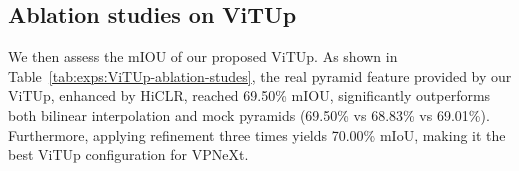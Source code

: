 \begin{table}[ht]
    \centering
    \caption{Ablation studies on ViTUp, all the results are obtained under the single-scale without flipping.
    All baseline models are trained using the same backbone and settings.
    }
    \label{tab:exps:ViTUp-ablation-studes}
\end{table}

\begin{table}[ht]
    \centering
    \caption{
    Computational cost analysis for VPNeXt.
    All baseline models use the same backbone and settings.
    }
    \label{tab:exps:cost-ablation-studes}
\end{table}





\subsection{Ablation studies on ViTUp}
We then assess the mIOU of our proposed ViTUp. 
%
As shown in Table~\ref{tab:exps:ViTUp-ablation-studes}, the real pyramid feature provided by our ViTUp, enhanced by HiCLR, reached 69.50\% mIOU, significantly outperforms both bilinear interpolation and mock pyramids (69.50\% vs 68.83\% vs 69.01\%). 
%
Furthermore, applying refinement three times yields 70.00\% mIoU, making it the best ViTUp configuration for VPNeXt.



